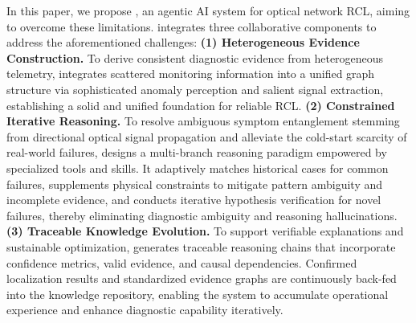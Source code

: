 In this paper, we propose \name{}, an agentic AI system for optical network RCL, aiming to overcome these limitations.
\name{} integrates three collaborative components to address the aforementioned challenges: 
\textbf{(1) Heterogeneous Evidence Construction.} To derive consistent diagnostic evidence from heterogeneous telemetry, \name{} integrates scattered monitoring information into a unified graph structure via sophisticated anomaly perception and salient signal extraction, establishing a solid and unified foundation for reliable RCL.
\textbf{(2) Constrained Iterative Reasoning.} To resolve ambiguous symptom entanglement stemming from directional optical signal propagation and alleviate the cold-start scarcity of real-world failures, \name{} designs a multi-branch reasoning paradigm empowered by specialized tools and skills. It adaptively matches historical cases for common failures, supplements physical constraints to mitigate pattern ambiguity and incomplete evidence, and conducts iterative hypothesis verification for novel failures, thereby eliminating diagnostic ambiguity and reasoning hallucinations.
\textbf{(3) Traceable Knowledge Evolution.} To support verifiable explanations and sustainable optimization, \name{} generates traceable reasoning chains that incorporate confidence metrics, valid evidence, and causal dependencies. Confirmed localization results and standardized evidence graphs are continuously back-fed into the knowledge repository, enabling the system to accumulate operational experience and enhance diagnostic capability iteratively.
